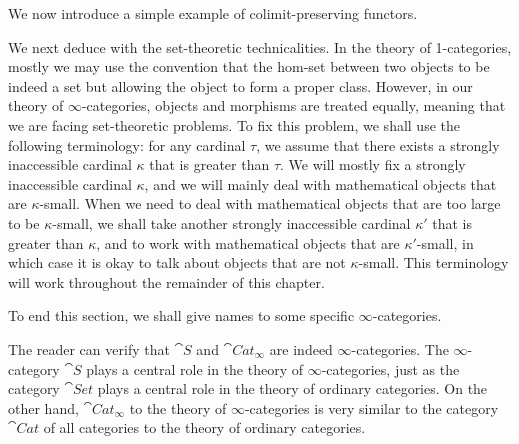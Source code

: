 We now introduce a simple example of colimit-preserving functors.


We next deduce with the set-theoretic technicalities. In the theory of 1-categories, mostly we may use the convention that 
the hom-set between two objects to be indeed a set but allowing the object to form a proper class. However,
in our theory of $\infty$-categories, objects and morphisms are treated equally, meaning that we are facing set-theoretic problems.
To fix this problem, we shall use the following terminology: for any cardinal $\tau$, we assume that there exists a strongly inaccessible cardinal
$\kappa$ that is greater than $\tau$. We will mostly fix a strongly inaccessible cardinal $\kappa$, and we will mainly deal with
mathematical objects that are $\kappa$-small. When we need to deal with mathematical objects that are too large to be
$\kappa$-small, we shall take another strongly inaccessible cardinal $\kappa'$ that is greater than $\kappa$, and to work
with mathematical objects that are $\kappa'$-small, in which case it is okay to talk about objects that are not $\kappa$-small.
This terminology will work throughout the remainder of this chapter.

To end this section, we shall give names to some specific $\infty$-categories.


The reader can verify that $\cat S$ and $\cat{Cat}_\infty$ are indeed $\infty$-categories. The $\infty$-category
$\cat S$ plays a central role in the theory of $\infty$-categories, just as the category $\cat{Set}$ plays a central role 
in the theory of ordinary categories. On the other hand, $\cat{Cat}_\infty$ to the theory of $\infty$-categories is very similar to the category 
$\cat{Cat}$ of all categories to the theory of ordinary categories.


